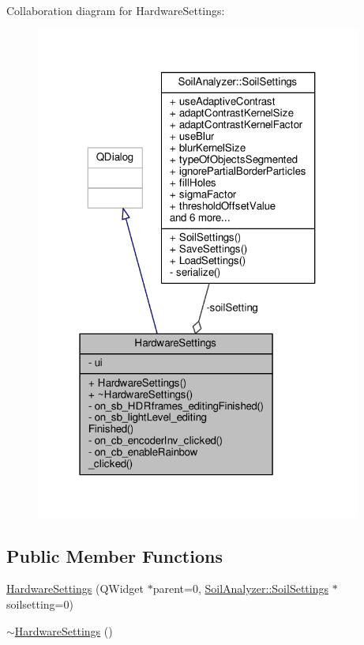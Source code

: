 Collaboration diagram for Hardware\+Settings\+:\nopagebreak
\begin{figure}[H]
\begin{center}
\leavevmode
\includegraphics[width=304pt]{class_hardware_settings__coll__graph}
\end{center}
\end{figure}
\subsection*{Public Member Functions}
\begin{DoxyCompactItemize}
\item 
\hyperlink{class_hardware_settings_a354b31caf3670eadd6b60cd6dd01c315}{Hardware\+Settings} (Q\+Widget $\ast$parent=0, \hyperlink{class_soil_analyzer_1_1_soil_settings}{Soil\+Analyzer\+::\+Soil\+Settings} $\ast$soilsetting=0)
\item 
\hyperlink{class_hardware_settings_a638ad23710a2c39a95473b3b4374ebb7}{$\sim$\+Hardware\+Settings} ()
\end{DoxyCompactItemize}
